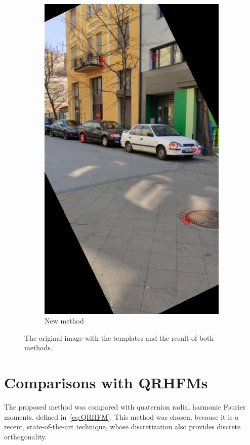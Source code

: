 \begin{figure}[tbp]
\begin{subfigure}{0.45\textwidth}
    \includegraphics[width=\textwidth, trim=0 200 0 80, clip]{figures/templates/new.png}
	\caption{New method}
    \end{subfigure}
    \caption{The original image with the templates and the result of both methods.}
    \label{fig:template_match}
\end{figure}


\section{Comparisons with QRHFMs}
The proposed method was compared with quaternion radial harmonic Fourier moments, defined in~\eqref{eq:QRHFM}. This method was chosen, because it is a recent, state-of-the-art technique, whose discretization also provides discrete orthogonality.

